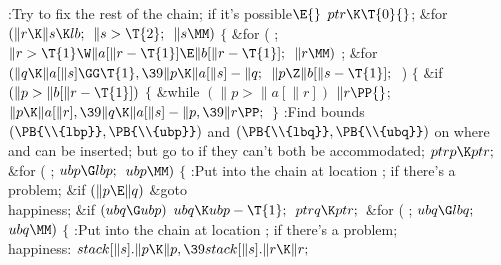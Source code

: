 \Y\B\4:Try to fix the rest of the chain;  if it's
possible\X${}\E{}$\6
$\\{ptr}\K\T{0}{}$;\6
\&{for} ${}(\|r\K\|s\K\\{lb};{}$ ${}\|s>\T{2};{}$ ${}\|s\MM){}$\5
${}\{{}$\1\6
\&{for} ( ; ${}\|r>\T{1}\W\|a[\|r-\T{1}]\E\|b[\|r-\T{1}];{}$ ${}\|r\MM){}$\1\5
;\2\6
\&{for} ${}(\|q\K\|a[\|s]\GG\T{1},\39\|p\K\|a[\|s]-\|q;{}$ ${}\|p\Z\|b[\|s-%
\T{1}];{}$ \,)\5
${}\{{}$\1\6
\&{if} ${}(\|p>\|b[\|r-\T{1}]){}$\5
${}\{{}$\1\6
\&{while} ${}(\|p>\|a[\|r]){}$\1\5
${}\|r\PP{}$;\2\6
${}\|p\K\|a[\|r],\39\|q\K\|a[\|s]-\|p,\39\|r\PP;{}$\6
\4${}\}{}$\2\6
:Find bounds $(\PB{\\{lbp}},\PB{\\{ubp}})$ and $(\PB{\\{lbq}},\PB{\\{ubq}})$
on where  and  can be inserted; but go to  if
they can't both be accommodated\X;\6
${}\\{ptrp}\K\\{ptr};{}$\6
\&{for} ( ; ${}\\{ubp}\G\\{lbp};{}$ ${}\\{ubp}\MM){}$\5
${}\{{}$\1\6
:Put  into the chain at location ;  if there's a problem\X;\6
\&{if} ${}(\|p\E\|q){}$\1\5
\&{goto} \\{happiness};\2\6
\&{if} ${}(\\{ubq}\G\\{ubp}){}$\1\5
${}\\{ubq}\K\\{ubp}-\T{1};{}$\2\6
${}\\{ptrq}\K\\{ptr};{}$\6
\&{for} ( ; ${}\\{ubq}\G\\{lbq};{}$ ${}\\{ubq}\MM){}$\5
${}\{{}$\1\6
:Put  into the chain at location ;  if there's a problem\X;\6
\4\\{happiness}:\5
${}\\{stack}[\|s].\|p\K\|p,\39\\{stack}[\|s].\|r\K\|r;{}$\6
